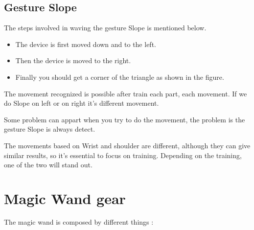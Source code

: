 \subsection{Gesture Slope}

\begin{center}	
    
    
\end{center}
The steps involved in waving the gesture Slope  is mentioned below.
\begin{itemize}
    
    \item The device is first moved down and to the left.
    \item Then the device is moved to the right.
    \item Finally you should get a corner of the triangle as shown in the figure.
    
\end{itemize}

The movement recognized is possible after train each part, each movement. If we do Slope on left or on right it's different movement.

Some problem can appart when you try to do the movement, the problem  is the gesture Slope is always detect. 

The movements based on Wrist and shoulder are different, although they can give similar results, so it's essential to focus on training. Depending on the training, one of the two will stand out. 


\section{Magic Wand gear}

The magic wand is composed by different things : 

